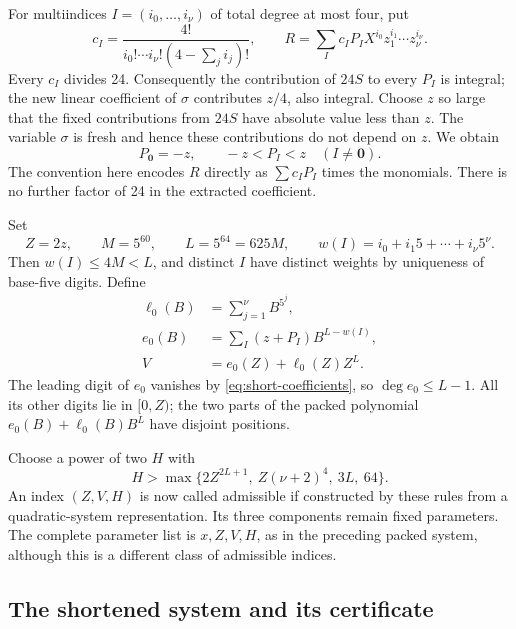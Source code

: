 For multiindices $I=(i_0,\ldots,i_\nu)$ of total degree at most four,
put
\[
 c_I=\frac{4!}{i_0!\cdots i_\nu!(4-\sum_j i_j)!},
 \qquad R=\sum_I c_IP_I X^{i_0}z_1^{i_1}\cdots z_\nu^{i_\nu}.
\]
Every $c_I$ divides 24. Consequently the contribution of $24S$ to every
$P_I$ is integral; the new linear coefficient of $\sigma$ contributes
$z/4$, also integral. Choose $z$ so large that the fixed contributions
from $24S$ have absolute value less than $z$. The variable $\sigma$ is
fresh and hence these contributions do not depend on $z$. We obtain
\begin{equation}
 P_{\boldsymbol0}=-z,
 \qquad -z<P_I<z\quad(I\ne\boldsymbol0).
 \label{eq:short-coefficients}
\end{equation}
The convention here encodes $R$ directly as $\sum c_IP_I$ times the
monomials. There is no further factor of 24 in the extracted coefficient.

Set
\[
 Z=2z,\qquad M=5^{60},\qquad L=5^{64}=625M,
 \qquad w(I)=i_0+i_1 5+\cdots+i_\nu5^\nu.
\]
Then $w(I)\le4M<L$, and distinct $I$ have distinct weights by uniqueness
of base-five digits. Define
\begin{align*}
 \ell_0(B)&=\sum_{j=1}^{\nu}B^{5^j},\\
 e_0(B)&=\sum_I(z+P_I)B^{L-w(I)},\\
 V&=e_0(Z)+\ell_0(Z)Z^L.
\end{align*}
The leading digit of $e_0$ vanishes by
\eqref{eq:short-coefficients}, so $\deg e_0\le L-1$. All its other
digits lie in $[0,Z)$; the two parts of the packed polynomial
$e_0(B)+\ell_0(B)B^L$ have disjoint positions.

Choose a power of two $H$ with
\begin{equation}
 H>\max\{2Z^{2L+1},\ Z(\nu+2)^4,\ 3L,\ 64\}.
 \label{eq:short-H}
\end{equation}
An index $(Z,V,H)$ is now called admissible if constructed by these rules
from a quadratic-system representation. Its three components remain
fixed parameters. The complete parameter list is $x,Z,V,H$, as in the
preceding packed system, although this is a different class of admissible
indices.

\subsection{The shortened system and its certificate}

